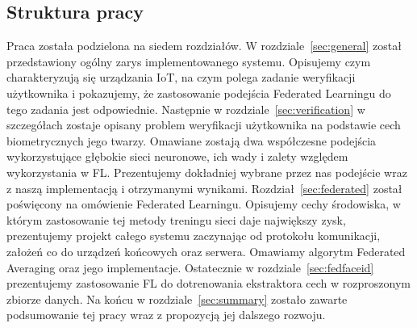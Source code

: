 \subsection{Struktura pracy}
Praca została podzielona na siedem rozdziałów. W rozdziale~\ref{sec:general} został przedstawiony ogólny zarys implementowanego systemu. Opisujemy czym charakteryzują się urządzania IoT, na czym
polega zadanie weryfikacji użytkownika i pokazujemy, że zastosowanie podejścia Federated
Learningu do tego zadania jest odpowiednie. Następnie w rozdziale~\ref{sec:verification} w
szczegółach zostaje opisany problem weryfikacji użytkownika na podstawie cech biometrycznych jego
twarzy. Omawiane zostają dwa współczesne podejścia wykorzystujące głębokie sieci neuronowe, ich
wady i zalety względem wykorzystania w FL. Prezentujemy dokładniej wybrane przez nas podejście
wraz z naszą implementacją i otrzymanymi wynikami. Rozdział~\ref{sec:federated} został poświęcony
na omówienie Federated Learningu. Opisujemy cechy środowiska, w którym zastosowanie tej metody
treningu sieci daje największy zysk, prezentujemy projekt całego systemu zaczynając od protokołu
komunikacji, założeń co do urządzeń końcowych oraz serwera. Omawiamy algorytm Federated
Averaging oraz jego implementacje. Ostatecznie w rozdziale~\ref{sec:fedfaceid} prezentujemy zastosowanie FL do dotrenowania
ekstraktora cech w rozproszonym zbiorze danych. Na końcu w rozdziale~\ref{sec:summary} zostało
zawarte podsumowanie tej pracy wraz z propozycją jej dalszego rozwoju.